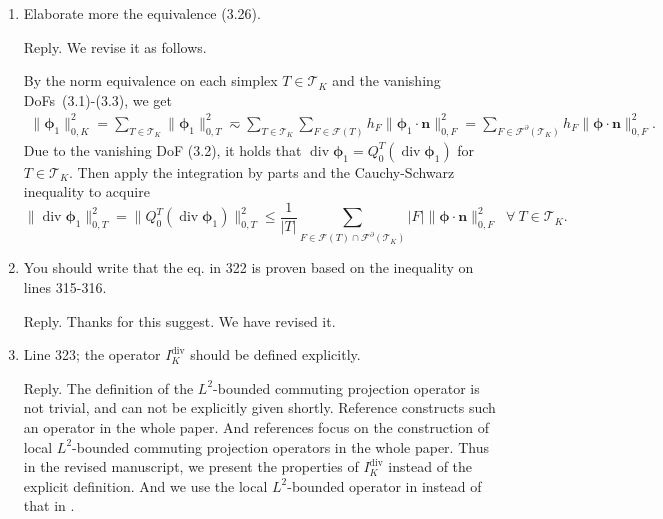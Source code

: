 \documentclass[10pt]{amsart}
\theoremstyle{definition}
\theoremstyle{remark}
\renewcommand{\div}{\operatorname{div}}
\begin{document}
\begin{enumerate}[1.]
\medskip

\item \textsf{Elaborate more the equivalence (3.26).}

\smallskip \noindent \textcolor[rgb]{1.00,0.00,0.00}{Reply.}
We revise it as follows.

By the norm equivalence on each simplex $T\in\mathcal T_K$ and the vanishing DoFs~(3.1)-(3.3), we get
\begin{align*}%
\|\boldsymbol{\phi}_1\|_{0,K}^2 = \sum_{T\in\mathcal T_K}\|\boldsymbol{\phi}_1\|_{0,T}^2 \eqsim \sum_{T\in\mathcal T_K}\sum_{F\in\mathcal F(T)}h_F\|\boldsymbol{\phi}_1\cdot\boldsymbol{n}\|_{0,F}^2 =\sum_{F\in\mathcal F^{\partial}(\mathcal T_K)}h_F\|\boldsymbol{\phi}\cdot\boldsymbol{n}\|_{0,F}^2.
\end{align*}
Due to the vanishing DoF (3.2), it holds that $\div\boldsymbol{\phi}_1=Q_0^T(\div\boldsymbol{\phi}_1)$ for $T\in\mathcal T_K$.
Then apply the integration by parts and the Cauchy-Schwarz inequality to acquire
\begin{equation*}%
\|\div\boldsymbol{\phi}_1\|_{0,T}^2=\|Q_0^T(\div\boldsymbol{\phi}_1)\|_{0,T}^2
\leq\frac{1}{|T|}\sum_{F\in\mathcal F(T)\cap\mathcal F^{\partial}(\mathcal T_K)}|F|\|\boldsymbol{\phi}\cdot\boldsymbol{n}\|_{0,F}^2\;\;\forall~T\in\mathcal T_K.
\end{equation*}

\medskip

\item \textsf{You should write that the eq. in 322 is proven based on the inequality on lines 315-316.}

\smallskip \noindent \textcolor[rgb]{1.00,0.00,0.00}{Reply.}
Thanks for this suggest. We have revised it.

\medskip

\item \textsf{Line 323; the operator $I_K^{\div}$ should be defined explicitly.}

\smallskip \noindent \textcolor[rgb]{1.00,0.00,0.00}{Reply.}
The definition of the $L^2$-bounded commuting projection operator is not trivial, and can not be explicitly given shortly.
Reference \cite{ChristiansenWinther2008} constructs such an operator in the whole paper. 
And references \cite{ArnoldGuzman2021,FalkWinther2014} focus on the construction of local $L^2$-bounded commuting projection operators in the whole paper. Thus in the revised manuscript, we present the properties of $I_K^{\div}$ instead of the explicit definition. And we use the local $L^2$-bounded operator in \cite{ArnoldGuzman2021,FalkWinther2014} instead of that in \cite{ChristiansenWinther2008}.


\end{enumerate}
\end{document}
